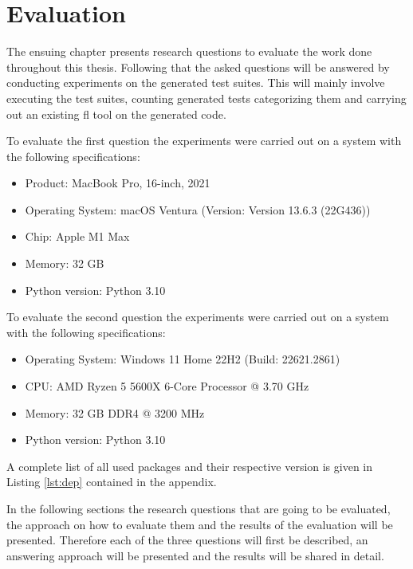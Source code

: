 \documentclass[
fancyheadings, %
%
%
]{stsreprt}
\begin{document}
\chapter{Evaluation}\label{ch:eval}
The ensuing chapter presents research questions to evaluate the work done throughout this thesis. Following that the asked questions will be answered by conducting experiments on the generated test suites. This will mainly involve executing the test suites, counting generated tests categorizing them and carrying out an existing \acrshort{fl} tool on the generated code. \par
To evaluate the first question the experiments were carried out on a system with the following specifications: 
\begin{itemize}
    \item Product: MacBook Pro, 16-inch, 2021
    \item Operating System: macOS Ventura (Version: Version 13.6.3 (22G436))
    \item Chip: Apple M1 Max
    \item Memory: 32 GB
    \item Python version: Python 3.10
\end{itemize}

To evaluate the second question the experiments were carried out on a system with the following specifications: 
\begin{itemize}
    \item Operating System: Windows 11 Home 22H2 (Build: 22621.2861)
    \item CPU: AMD Ryzen 5 5600X 6-Core Processor @ 3.70 GHz
    \item Memory: 32 GB DDR4 @ 3200 MHz
    \item Python version: Python 3.10
\end{itemize}

A complete list of all used packages and their respective version is given in Listing \ref{lst:dep} contained in the appendix. \par 

In the following sections the research questions that are going to be evaluated, the approach on how to evaluate them and the results of the evaluation will be presented. 
Therefore each of the three questions will first be described, an answering approach will be presented and the results will be shared in detail.
\end{document}
